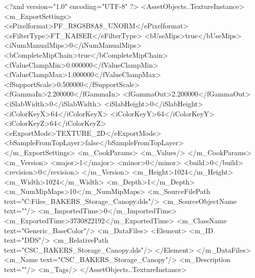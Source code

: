<?xml version="1.0" encoding="UTF-8" ?>
<AssetObjects..TextureInstance>
	<m_ExportSettings>
		<ePixelformat>PF_R8G8B8A8_UNORM</ePixelformat>
		<eFilterType>FT_KAISER</eFilterType>
		<bUseMips>true</bUseMips>
		<iNumManualMips>0</iNumManualMips>
		<bCompleteMipChain>true</bCompleteMipChain>
		<fValueClampMin>0.000000</fValueClampMin>
		<fValueClampMax>1.000000</fValueClampMax>
		<fSupportScale>0.500000</fSupportScale>
		<fGammaIn>2.200000</fGammaIn>
		<fGammaOut>2.200000</fGammaOut>
		<iSlabWidth>0</iSlabWidth>
		<iSlabHeight>0</iSlabHeight>
		<iColorKeyX>64</iColorKeyX>
		<iColorKeyY>64</iColorKeyY>
		<iColorKeyZ>64</iColorKeyZ>
		<eExportMode>TEXTURE_2D</eExportMode>
		<bSampleFromTopLayer>false</bSampleFromTopLayer>
	</m_ExportSettings>
	<m_CookParams>
		<m_Values/>
	</m_CookParams>
	<m_Version>
		<major>1</major>
		<minor>0</minor>
		<build>0</build>
		<revision>0</revision>
	</m_Version>
	<m_Height>1024</m_Height>
	<m_Width>1024</m_Width>
	<m_Depth>1</m_Depth>
	<m_NumMipMaps>10</m_NumMipMaps>
	<m_SourceFilePath text="C:\Users\Shadow\Desktop\Working Files\Textures\CSC_BAKERS_Storage_Canopy.dds"/>
	<m_SourceObjectName text=""/>
	<m_ImportedTime>0</m_ImportedTime>
	<m_ExportedTime>3730822192</m_ExportedTime>
	<m_ClassName text="Generic_BaseColor"/>
	<m_DataFiles>
		<Element>
			<m_ID text="DDS"/>
			<m_RelativePath text="CSC_BAKERS_Storage_Canopy.dds"/>
		</Element>
	</m_DataFiles>
	<m_Name text="CSC_BAKERS_Storage_Canopy"/>
	<m_Description text=""/>
	<m_Tags/>
</AssetObjects..TextureInstance>

